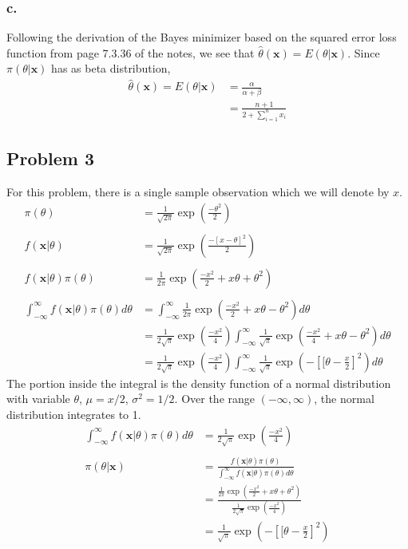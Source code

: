 \documentclass{article}
\begin{document}
\subsubsection*{c.}

Following the derivation of the Bayes minimizer based on the squared error loss function from page 7.3.36 of the notes, we see that $\hat{\theta}(\mathbf{x}) = E(\theta|\mathbf{x})$.
Since $\pi(\theta|\mathbf{x})$ has as beta distribution, 
\begin{align*}
\hat{\theta}(\mathbf{x}) = E(\theta|\mathbf{x}) &= \frac{\alpha}{\alpha + \beta} \\
&= \frac{n+1}{2+\sum_{i=1}^n x_i}
\end{align*}
\subsection*{Problem 3}
For this problem, there is a single sample observation which we will denote by $x$.
\begin{align*}
\pi(\theta) &= \frac{1}{\sqrt{2\pi}}\exp\left(\frac{-\theta^2}{2}\right) \\ \\ 
f(\mathbf{x}|\theta) &= \frac{1}{\sqrt{2\pi}}\exp\left(\frac{-[x-\theta]^2}{2}\right) \\ \\ 
f(\mathbf{x}|\theta)\pi(\theta) &= \frac{1}{2\pi}\exp\left(\frac{-x^2}{2}+x\theta+\theta^2\right) \\ \\
\int_{-\infty}^\infty f(\mathbf{x}|\theta)\pi(\theta) d\theta &= \int_{-\infty}^\infty\frac{1}{2\pi}\exp\left(\frac{-x^2}{2}+x\theta-\theta^2\right)d\theta \\
&=\frac{1}{2\sqrt{\pi}}\exp\left(\frac{-x^2}{4}\right)\int_{-\infty}^\infty \frac{1}{\sqrt{\pi}}\exp\left(\frac{-x^2}{4}+x\theta-\theta^2\right)d\theta \\ 
&=\frac{1}{2\sqrt{\pi}}\exp\left(\frac{-x^2}{4}\right)\int_{-\infty}^\infty \frac{1}{\sqrt{\pi}}\exp\left(-\left[[\theta-\frac{x}{2}\right]^2\right) d\theta
\end{align*}
The portion inside the integral is the density function of a normal distribution with variable $\theta$, $\mu = x/2$, $\sigma^2 = 1/2$. Over the range $(-\infty, \infty)$, the normal distribution integrates to 1. 
\begin{align*}
\int_{-\infty}^\infty f(\mathbf{x}|\theta)\pi(\theta) d\theta &= \frac{1}{2\sqrt{\pi}}\exp\left(\frac{-x^2}{4}\right) \\ \\
\pi(\theta|\mathbf{x}) &= \frac{f(\mathbf{x}|\theta)\pi(\theta)}{\int_{-\infty}^\infty f(\mathbf{x}|\theta)\pi(\theta) d\theta} \\
&= \frac{\frac{1}{2\pi}\exp\left(\frac{-x^2}{2}+x\theta+\theta^2\right)}{\frac{1}{2\sqrt{\pi}}\exp\left(\frac{-x^2}{4}\right)} \\
&=\frac{1}{\sqrt{\pi}}\exp\left(-\left[[\theta-\frac{x}{2}\right]^2\right)
\end{align*}
\end{document}
